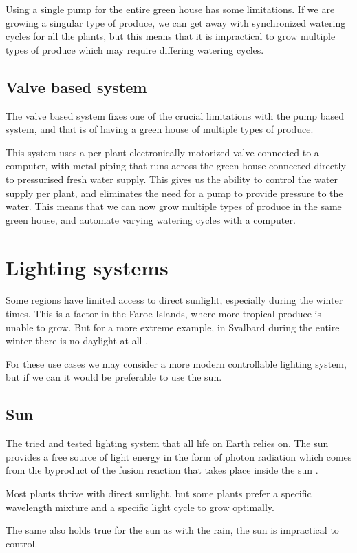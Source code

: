 \documentclass[12pt,a4paper,oneside]{book}
\begin{document}
Using a single pump for the entire green house has some limitations.
If we are growing a singular type of produce, we can get away with synchronized watering cycles for all the plants, but this means that it is impractical to grow multiple types of produce which may require differing watering cycles.

\subsection{Valve based system}
The valve based system fixes one of the crucial limitations with the pump based system, and that is of having a green house of multiple types of produce.

This system uses a per plant electronically motorized valve connected to a computer, with metal piping that runs across the green house connected directly to pressurised fresh water supply.
This gives us the ability to control the water supply per plant, and eliminates the need for a pump to provide pressure to the water.
This means that we can now grow multiple types of produce in the same green house, and automate varying watering cycles with a computer.

\section{Lighting systems}
Some regions have limited access to direct sunlight, especially during the winter times.
This is a factor in the Faroe Islands, where more tropical produce is unable to grow.
But for a more extreme example, in Svalbard during the entire winter there is no daylight at all \cite{svalbard}.

For these use cases we may consider a more modern controllable lighting system, but if we can it would be preferable to use the sun.

\subsection{Sun}
The tried and tested lighting system that all life on Earth relies on.
The sun provides a free source of light energy in the form of photon radiation which comes from the byproduct of the fusion reaction that takes place inside the sun \cite{abhyankar}.

Most plants thrive with direct sunlight, but some plants prefer a specific wavelength mixture and a specific light cycle to grow optimally.

The same also holds true for the sun as with the rain, the sun is impractical to control.
\end{document}
